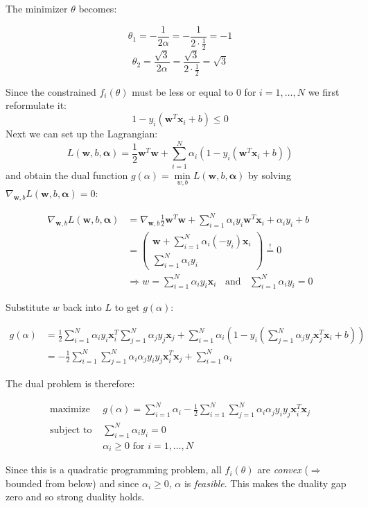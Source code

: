 \begin{flushleft}
The minimizer $\theta$ becomes:
\end{flushleft}
\[ \theta_1 = -\frac{1}{2\alpha} = -\frac{1}{2\cdot\frac{1}{2}} = -1 \]
\[ \theta_2 = \frac{\sqrt{3}}{2 \alpha} = \frac{\sqrt{3}}{2 \cdot \frac{1}{2}} = \sqrt{3} \]
%
%
\newpage
{}
%
\begin{flushleft}
Since the constrained $f_i(\theta)$ must be less or equal to 0 for $i=1,\ldots,N$ we first reformulate it:
\[ 1 - y_i(\mathbf{w}^T \mathbf{x}_i + b) \leq 0 \]
Next we can set up the Lagrangian: 
\[ L(\mathbf{w}, b, \mathbf{\alpha}) = \frac{1}{2} \mathbf{w}^T\mathbf{w} + \sum_{i=1}^N \alpha_i (1 - y_i(\mathbf{w}^T \mathbf{x}_i + b)) \]
and obtain the dual function $g(\alpha) = \underset{w,b}{\min} L(\mathbf{w},b,\mathbf{\alpha})$ by solving $\nabla_{\mathbf{w},b} L(\mathbf{w},b,\mathbf{\alpha}) = 0$:
\end{flushleft}
\begin{align*}
  \nabla_{\mathbf{w},b} L(\mathbf{w},b,\mathbf{\alpha}) &= \nabla_{\mathbf{w},b} \frac{1}{2} \mathbf{w}^T\mathbf{w} + \sum_{i=1}^N \alpha_i y_i \mathbf{w}^T \mathbf{x}_i + \alpha_i y_i + b \\
  &= \begin{pmatrix} \mathbf{w} + \sum_{i=1}^N \alpha_i (-y_i) \mathbf{x}_i \\ \sum_{i=1}^N \alpha_i y_i \end{pmatrix} \overset{!}{=} 0 \\
  &\Rightarrow w = \sum_{i=1}^N \alpha_i y_i \mathbf{x}_i \;\;\text{ and }\;\; \sum_{i=1}^N \alpha_i y_i = 0
\end{align*}
\begin{flushleft}
Substitute $w$ back into $L$ to get $g(\alpha)$:
\end{flushleft}
\begin{align*}
g(\alpha) &= \frac{1}{2} \sum_{i=1}^N \alpha_i y_i \mathbf{x}_i^T \sum_{j=1}^N \alpha_j y_j \mathbf{x}_j + \sum_{i=1}^N \alpha_i \left( 1 - y_i \left( \sum_{j=1}^N \alpha_j y_j \mathbf{x}_j^T \mathbf{x}_i + b \right) \right) \\
&= -\frac{1}{2} \sum_{i=1}^N\sum_{j=1}^N \alpha_i \alpha_j y_i y_j \mathbf{x}_i^T \mathbf{x}_j + \sum_{i=1}^N \alpha_i
\end{align*}
\begin{flushleft}
The dual problem is therefore:
\end{flushleft}
\begin{align*}
\text{maximize } & g(\alpha) = \sum_{i=1}^N \alpha_i - \frac{1}{2} \sum_{i=1}^N\sum_{j=1}^N \alpha_i \alpha_j y_i y_j \mathbf{x}_i^T \mathbf{x}_j \\
\text{subject to } & \sum_{i=1}^N \alpha_i y_i = 0 \\
& \alpha_i \geq 0 \text{ for } i=1,\ldots,N
\end{align*}
\begin{flushleft}
Since this is a quadratic programming problem, all $f_i(\theta)$ are \textit{convex} ($\Rightarrow$ bounded from below) and since $\alpha_i \geq 0$, $\alpha$ is \textit{feasible}. This makes the duality gap zero and so strong duality holds.
\end{flushleft}

